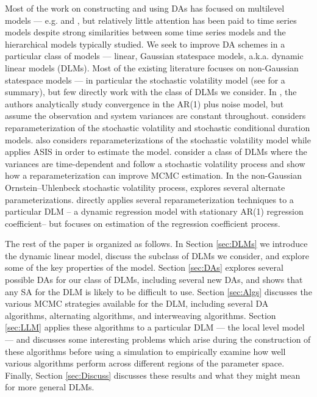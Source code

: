 \documentclass{article}
\begin{document}
Most of the work on constructing and using DAs has focused on multilevel models --- e.g.  and , but relatively little attention has been paid to time series models despite strong similarities between some time series models and the hierarchical models typically studied. We seek to improve DA schemes in a particular class of models --- linear, Gaussian statespace models, a.k.a. dynamic linear models (DLMs). Most of the existing literature focuses on non-Gaussian statespace models --- in particular the stochastic volatility model (see  for a summary), but few directly work with the class of DLMs we consider. In , the authors analytically study convergence in the AR(1) plus noise model, but assume the observation and system variances are constant throughout.  considers reparameterization of the stochastic volatility and stochastic conditional duration models.  also considers reparameterizations of the stochastic volatility model while  applies ASIS in order to estimate the model.  consider a class of DLMs where the variances are time-dependent and follow a stochastic volatility process and show how a reparameterization can improve MCMC estimation. In the non-Gaussian Ornstein--Uhlenbeck stochastic volatility process,  explores several alternate parameterizations.  directly applies several reparameterization techniques to a particular DLM -- a dynamic regression model with stationary AR(1) regression coefficient-- but focuses on estimation of the regression coefficient process.

The rest of the paper is organized as follows. In Section \ref{sec:DLMs} we introduce the dynamic linear model, discuss the subclass of DLMs we consider, and explore some of the key properties of the model. Section \ref{sec:DAs} explores several possible DAs for our class of DLMs, including several new DAs, and shows that any SA for the DLM is likely to be difficult to use. Section \ref{sec:Algs} discusses the various MCMC strategies available for the DLM, including several DA algorithms, alternating algorithms, and interweaving algorithms. Section \ref{sec:LLM} applies these algorithms to a particular DLM --- the local level model --- and discusses some interesting problems which arise during the construction of these algorithms before using a simulation to empirically examine how well various algorithms perform across different regions of the parameter space. Finally, Section \ref{sec:Discuss} discusses these results and what they might mean for more general DLMs.
\end{document}
